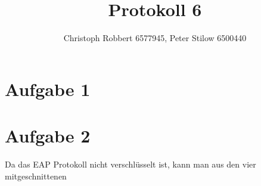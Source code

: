 \documentclass[10pt,a4paper]{article}
\author{Christoph Robbert 6577945, Peter Stilow 6500440}
\title{Protokoll 6}
\begin{document}
\maketitle
 
\section*{Aufgabe 1}

\section*{Aufgabe 2}
Da das EAP Protokoll nicht verschlüsselt ist, kann man aus den vier mitgeschnittenen
\end{document}
